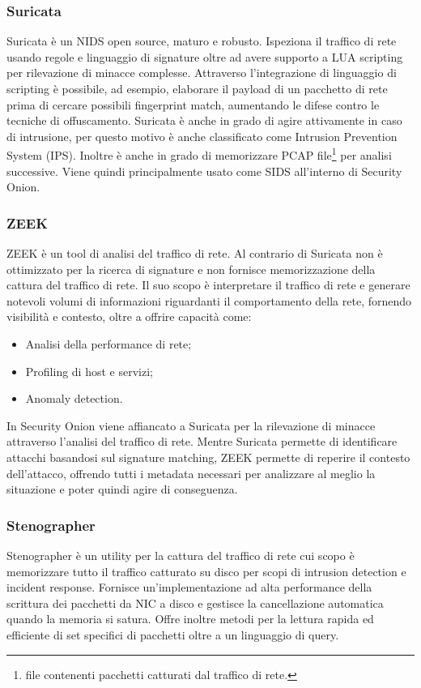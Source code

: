 \subsubsection*{Suricata}
Suricata \cite{suricata} è un NIDS open source, maturo e robusto. Ispeziona il traffico di rete usando regole e linguaggio di signature oltre ad avere supporto a LUA \cite{LUA} scripting per rilevazione di minacce complesse. Attraverso l'integrazione di linguaggio di scripting è possibile, ad esempio, elaborare il payload di un pacchetto di rete prima di cercare possibili fingerprint match, aumentando le difese contro le tecniche di offuscamento. 
Suricata è anche in grado di agire attivamente in caso di intrusione, per questo motivo è anche classificato come Intrusion Prevention System (IPS). Inoltre è anche in grado di memorizzare PCAP file\footnote{file contenenti pacchetti catturati dal traffico di rete.} per analisi successive.
Viene quindi principalmente usato come SIDS all'interno di Security Onion.
\subsubsection*{ZEEK}
ZEEK \cite{ZEEK} è un tool di analisi del traffico di rete. Al contrario di Suricata non è ottimizzato per la ricerca di signature e non fornisce memorizzazione della cattura del traffico di rete. Il suo scopo è interpretare il traffico di rete e generare notevoli volumi di informazioni riguardanti il comportamento della rete, fornendo visibilità e contesto, oltre a offrire capacità come:
\begin{itemize}
    \item Analisi della performance di rete;
    \item Profiling di host e servizi;
    \item Anomaly detection.
\end{itemize}
In Security Onion viene affiancato a Suricata per la rilevazione di minacce attraverso l'analisi del traffico di rete. Mentre Suricata permette di identificare attacchi basandosi sul signature matching, ZEEK permette di reperire il contesto dell'attacco,  offrendo tutti i metadata necessari per analizzare al meglio la situazione e poter quindi agire di conseguenza.

\subsubsection*{Stenographer}
Stenographer \cite{stenographer} è un utility per la cattura del traffico di rete cui scopo è memorizzare tutto il traffico catturato su disco per scopi di intrusion detection e incident response.
Fornisce un'implementazione ad alta performance della scrittura dei pacchetti da NIC a disco e gestisce la cancellazione automatica quando la memoria si satura. 
Offre inoltre metodi per la lettura rapida ed efficiente di set specifici di pacchetti oltre a un linguaggio di query.

